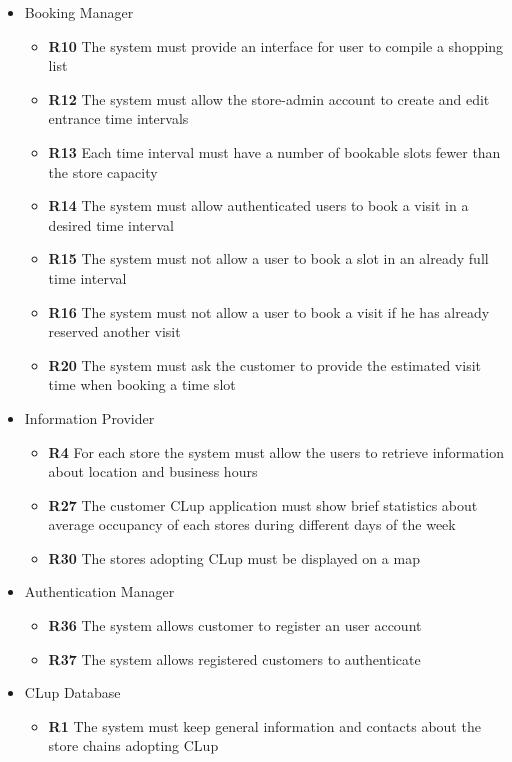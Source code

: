 \begin{itemize}
    \item Booking Manager
    \begin{itemize}
        \item \textbf{R10} The system must provide an interface for user to compile a shopping list
        \item \textbf{R12} The system must allow the store-admin account to create and edit entrance time intervals
        \item \textbf{R13} Each time interval must have a number of bookable slots fewer than the store capacity
        \item \textbf{R14} The system must allow authenticated users to book a visit in a desired time interval
        \item \textbf{R15} The system must not allow a user to book a slot in an already full time interval
        \item \textbf{R16} The system must not allow a user to book a visit if he has already reserved another visit
        \item \textbf{R20} The system must ask the customer to provide the estimated visit time when booking a time slot
    \end{itemize}
    \item Information Provider
    \begin{itemize}
        \item \textbf{R4} For each store the system must allow the users to retrieve information about location and business hours
        \item \textbf{R27} The customer CLup application must show brief statistics about average occupancy of each stores during different days of the week
        \item \textbf{R30} The stores adopting CLup must be displayed on a map
    \end{itemize}
    \item Authentication Manager
    \begin{itemize}
        \item \textbf{R36} The system allows customer to register an user account
        \item \textbf{R37} The system allows registered customers to authenticate
    \end{itemize}
    \item CLup Database
    \begin{itemize}
        \item \textbf{R1} The system must keep general information and contacts about the store chains adopting CLup

\end{itemize}
\end{itemize}
